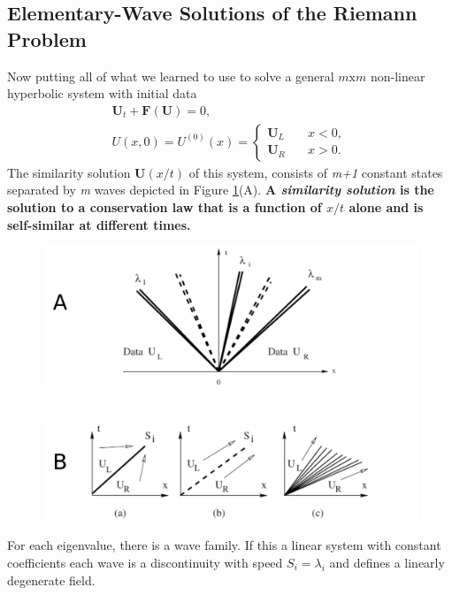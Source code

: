 \documentclass[]{article}
\begin{document}
		\subsection{Elementary-Wave Solutions of the Riemann Problem}
			Now putting all of what we learned to use to solve a general $ m \mbox{x} m $ non-linear hyperbolic system with initial data
			\begin{equation}
				\begin{aligned}
					\textbf{U}_t + \textbf{F}(\textbf{U}) = 0 \mbox{, } \\
					U(x,0) = U^{(0)}(x) = \left\{
					\begin{array}{ll}
					\textbf{U}_L & \quad x < 0, \\
					\textbf{U}_R & \quad x > 0.
					\end{array}
					\right.
				\end{aligned}
				\label{RPEquation}
			\end{equation}
			The similarity solution $ \textbf{U}(x/t) $ of this system, consists of \textit{m+1} constant states separated by \textit{m} waves depicted in Figure \ref{ElementaryWaveSolutions}(A). \textbf{A \textit{similarity solution} is the solution to a conservation law that is a function of $ x/t $ alone and is self-similar at different times.}
		
			\begin{figure}[h] 	
				\centering
				\includegraphics[scale=.55]{ElementaryWaveSolutions}
				\caption{}
				\label{ElementaryWaveSolutions}
			\end{figure}
			For each eigenvalue, there is a wave family. If this a linear system with constant coefficients each wave is a discontinuity with speed $ S_i = \lambda_i $ and defines a linearly degenerate field.
		
\end{document}
